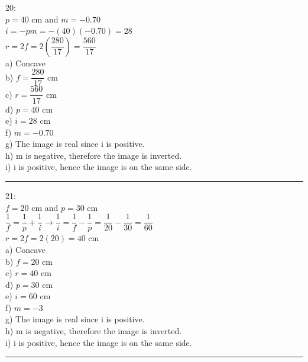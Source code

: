\documentclass[fleqn]{article}
\begin{document}
\begin{enumerate}
    \textcolor{hwColor}{
      20: \\
      $p=40$ cm and $m=-0.70$ \\
      $i=-pm=-(40)(-0.70)=28$ \\
      $r=2f=2(\dfrac{280}{17})=\dfrac{560}{17}$ \\
      a) Concave \\
      b) $f=\dfrac{280}{17}$ cm \\
      c) $r=\dfrac{560}{17}$ cm \\
      d) $p=40$ cm \\
      e) $i=28$ cm \\
      f) $m=-0.70$ \\
      g) The image is real since i is positive. \\
      h) m is negative, therefore the image is inverted. \\
      i) i is positive, hence the image is on the same side. \\
    }

    \textcolor{hwColor}{
      \rule{15cm}{0.4pt}
    }

    \textcolor{hwColor}{
      21: \\
      $f=20$ cm and $p=30$ cm \\
      $\dfrac{1}{f}=\dfrac{1}{p}+\dfrac{1}{i} \rightarrow \dfrac{1}{i}=\dfrac{1}{f}-\dfrac{1}{p}=\dfrac{1}{20}-\dfrac{1}{30}=\dfrac{1}{60}$ \\
      $r=2f=2(20)=40$ cm \\
      a) Concave \\
      b) $f=20$ cm \\
      c) $r=40$ cm \\
      d) $p=30$ cm \\
      e) $i=60$ cm \\
      f) $m=-3$ \\
      g) The image is real since i is positive. \\
      h) m is negative, therefore the image is inverted. \\
      i) i is positive, hence the image is on the same side. \\
    }

    \textcolor{hwColor}{
      \rule{15cm}{0.4pt}
    }


\end{enumerate}
\end{document}
